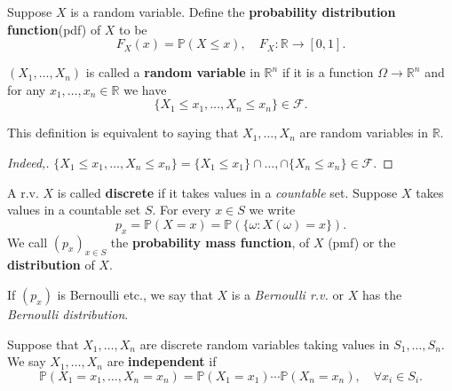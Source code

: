 \begin{definition}
    Suppose $X$ is a random variable. Define the \textbf{probability distribution function}(pdf) of $X$ to be 
    \[
        F_X(x) = \mathbb{P}(X\le x),\quad F_X: \mathbb{R} \to [0,1].
    \]
\end{definition}

\begin{definition}
    $ (X_1,\dots,X_n) $ is called a \textbf{random variable} in $ \mathbb{R}^{n} $ if it is a function $\Omega\to \mathbb{R}^{n}$ and for any $ x_1,\dots,x_n\in \mathbb{R}  $ we have 
    \[
        \{X_1\le x_1,\dots,X_n\le x_n\} \in \mathscr{F}.
    \]
\end{definition}

\begin{claim}
    This definition is equivalent to saying that $ X_1,\dots,X_n $ are random variables in $\mathbb{R}$.
\end{claim}
\begin{proof}[Indeed,]
    $ \{X_1\le x_1,\dots,X_n\le x_n\} = \{X_1\le x_1\}\cap\dots,\cap \{X_n\le x_n \} \in \mathscr{F}$.
\end{proof}

\begin{definition}
    A r.v. $X$ is called \textbf{discrete} if it takes values in a \textit{countable} set.
    Suppose $X$ takes values in a countable set $S$. For every $x\in S$ we write
    \[
        p_x=\mathbb{P}(X=x) = \mathbb{P}(\{\omega:X(\omega)=x\}).
    \]
    We call $ (p_x)_{x\in S} $ the \textbf{probability mass function}, of $X$ (pmf) or the \textbf{distribution} of $X$.
\end{definition}

\begin{note}
    If $(p_x)$ is Bernoulli etc., we say that $X$ is a \textit{Bernoulli r.v.} or $X$ has the \textit{Bernoulli distribution}.
\end{note}

\begin{definition}
    Suppose that $X_1,\dots,X_n$ are discrete random variables taking values in $S_1,\dots,S_n$. We say $X_1,\dots,X_n$ are \textbf{independent} if 
    \[
        \mathbb{P}(X_1=x_1,\dots,X_n=x_n)=\mathbb{P}(X_1=x_1)\cdots \mathbb{P}(X_n=x_n), \quad \forall x_i\in S_i.
    \]
\end{definition}


